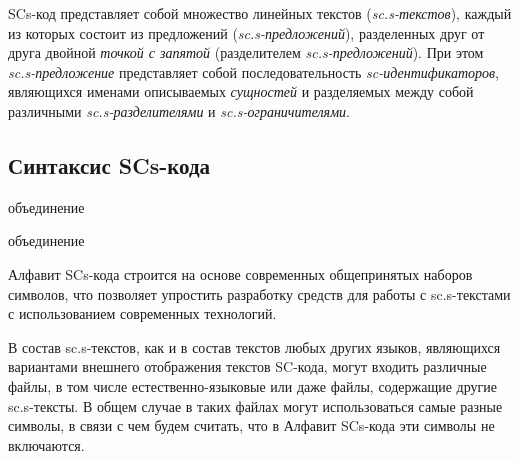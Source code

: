\begin{SCn}
\end{SCn}

SCs-код представляет собой множество линейных текстов (\textit{sc.s-текстов}), каждый из которых состоит из предложений (\textit{sc.s-предложений}), разделенных друг от друга двойной \textit{точкой с запятой} (разделителем \textit{sc.s-предложений}). При этом \mbox{\textit{sc.s-предложение}} представляет собой последовательность \textit{sc-идентификаторов}, являющихся именами описываемых \textit{сущностей} и разделяемых между собой различными \textit{sc.s-разделителями} и \textit{sc.s-ограничителями}.

\subsection{Синтаксис SCs-кода}

\begin{SCn}
	\begin{scnreltoset}{объединение}
			\begin{scnreltoset}{объединение}
			\end{scnreltoset}
	\end{scnreltoset}
\end{SCn} 

Алфавит SCs-кода строится на основе современных общепринятых наборов символов, что позволяет упростить разработку средств для работы с sc.s-текстами с использованием современных технологий.

В состав sc.s-текстов, как и в состав текстов любых других языков, являющихся вариантами внешнего отображения текстов SC-кода, могут входить различные файлы, в том числе естественно-языковые или даже файлы, содержащие другие sc.s-тексты. В общем случае в таких файлах могут использоваться самые разные символы, в связи с чем будем считать, что в Алфавит SCs-кода эти символы не включаются.


